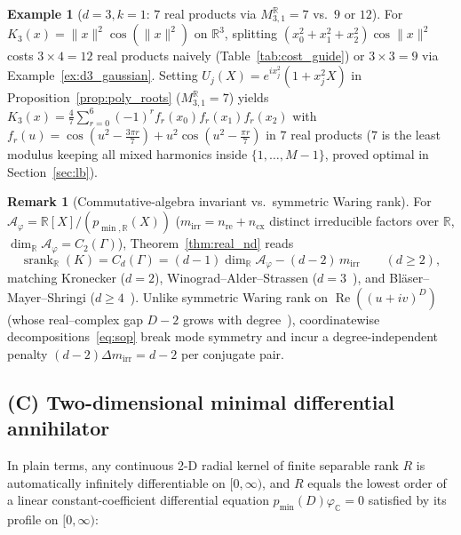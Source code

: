 \documentclass[11pt,a4paper]{article}
\theoremstyle{plain}
\theoremstyle{definition}
\newtheorem{remark}[theorem]{Remark}
\newtheorem{example}[theorem]{Example}
\newcommand{\R}{\mathbb{R}}
\newcommand{\C}{\mathbb{C}}
\DeclareMathOperator{\RePart}{Re}
\DeclareMathOperator{\srank}{srank}
\begin{document}
\begin{example}[$d = 3, k = 1$: $7$ real products via $M_{3,1}^{\R} = 7$ vs.\ $9$ or $12$]\label{ex:d3_deg1}
For $K_3(x) = \|x\|^2\cos(\|x\|^2)$ on $\R^3$, splitting $(x_0^2 + x_1^2 + x_2^2)\cos\|x\|^2$ costs $3 \times 4 = 12$ real products naively (Table~\ref{tab:cost_guide}) or $3 \times 3 = 9$ via Example~\ref{ex:d3_gaussian}. Setting $U_j(X) = e^{i x_j^2}(1 + x_j^2 X)$ in Proposition~\ref{prop:poly_roots} ($M_{3,1}^{\R} = 7$) yields $K_3(x) = \frac{4}{7}\sum_{r=0}^6 (-1)^r f_r(x_0)f_r(x_1)f_r(x_2)$ with $f_r(u) = \cos(u^2 - \frac{3\pi r}{7}) + u^2\cos(u^2 - \frac{\pi r}{7})$ in $7$ real products ($7$ is the least modulus keeping all mixed harmonics inside $\{1,\dots,M-1\}$, proved optimal in Section~\ref{sec:lb}).
\end{example}

\begin{remark}[Commutative-algebra invariant vs.\ symmetric Waring rank]\label{rem:waring}
For $\mathcal{A}_\varphi = \R[X]/(p_{\min,\R}(X))$ ($m_{\mathrm{irr}} = n_{\mathrm{re}} + n_{\mathrm{cx}}$ distinct irreducible factors over $\R$, $\dim_{\R}\mathcal{A}_\varphi = C_2(\Gamma)$), Theorem~\ref{thm:real_nd} reads
\begin{equation}\label{eq:algebra_inv}
  \srank_{\R}(K) = C_d(\Gamma) = (d - 1)\dim_{\R}\mathcal{A}_\varphi - (d - 2)\,m_{\mathrm{irr}} \qquad (d \ge 2),
\end{equation}
matching Kronecker ($d = 2$), Winograd--Alder--Strassen ($d = 3$~\cite{winograd1977some,fiduccia1977linear,alder1981alg,burgisser1997algebraic}), and Bl\"aser--Mayer--Shringi ($d \ge 4$~\cite{blaser2023multilinear}). Unlike symmetric Waring rank on $\RePart((u + iv)^D)$ (whose real--complex gap $D - 2$ grows with degree~\cite{comon2008symmetric,reznick2013length,blekherman2015typical}), coordinatewise decompositions~\eqref{eq:sop} break mode symmetry and incur a degree-independent penalty $(d - 2)\Delta m_{\mathrm{irr}} = d - 2$ per conjugate pair.
\end{remark}

\subsection{(C) Two-dimensional minimal differential annihilator}\label{sec:res_ann}

In plain terms, any continuous 2-D radial kernel of finite separable rank $R$ is automatically infinitely differentiable on $[0,\infty)$, and $R$ equals the lowest order of a linear constant-coefficient differential equation $p_{\min}(D)\varphi_{\C} = 0$ satisfied by its profile on $[0,\infty)$:
\end{document}
